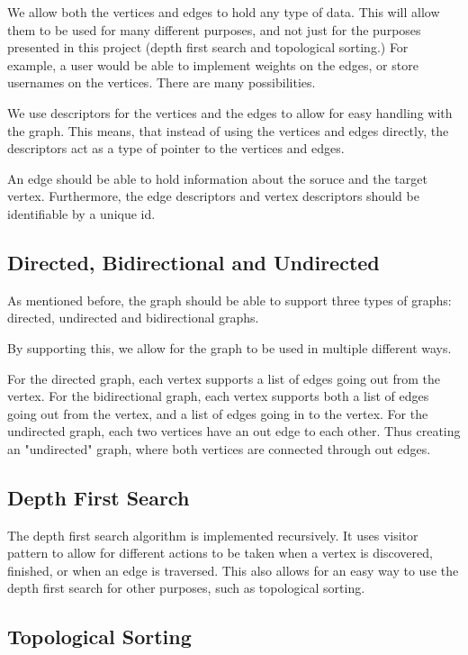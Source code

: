 \documentclass{article}
\begin{document}
We allow both the vertices and edges to hold any type of data.
This will allow them to be used for many different purposes, and not 
just for the purposes presented in this project (depth first search and topological sorting.)
For example, a user would be able to implement weights on the edges, or 
store usernames on the vertices. There are many possibilities.

We use descriptors for the vertices and the edges to allow for easy handling 
with the graph. This means, that instead of using the vertices and edges directly,
the descriptors act as a type of pointer to the vertices and edges.

An edge should be able to hold information about the soruce and the target vertex. 
Furthermore, the edge descriptors and vertex descriptors should be identifiable by a unique id. 

\subsection{Directed, Bidirectional and Undirected}

As mentioned before, the graph should be able to support three types of graphs: 
directed, undirected and bidirectional graphs. 

By supporting this, we allow for the graph to be used in multiple different ways.

For the directed graph, each vertex supports a list of edges going out from the vertex.
For the bidirectional graph, each vertex supports both a list of edges going out from the vertex, and a list of edges going in to the vertex.
For the undirected graph, each two vertices have an out edge to each other. Thus creating an "undirected" graph, where both vertices are connected through out edges.


\subsection{Depth First Search}

The depth first search algorithm is implemented recursively. It uses visitor pattern to allow for different actions to be taken when a vertex is discovered, finished, or when an edge is traversed.
This also allows for an easy way to use the depth first search for other purposes, such as topological sorting.


\subsection{Topological Sorting}
\end{document}
